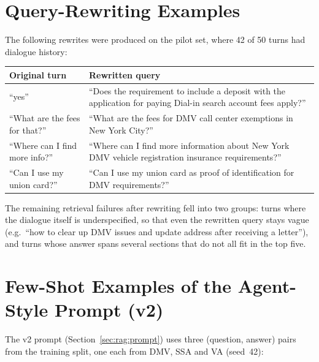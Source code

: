 \section{Query-Rewriting Examples}\label{ax:log:rewrites}

The following rewrites were produced on the pilot set, where 42 of 50 turns had
dialogue history:

\begin{center}
\small
\begin{tabular}{p{}p{}}
    \toprule
    Original turn & Rewritten query \\
    \midrule
    ``yes'' & ``Does the requirement to include a deposit with the application for
              paying Dial-in search account fees apply?'' \\
    ``What are the fees for that?'' & ``What are the fees for DMV call center
              exemptions in New York City?'' \\
    ``Where can I find more info?'' & ``Where can I find more information about
              New York DMV vehicle registration insurance requirements?'' \\
    ``Can I use my union card?'' & ``Can I use my union card as proof of
              identification for DMV requirements?'' \\
    \bottomrule
\end{tabular}
\end{center}

The remaining retrieval failures after rewriting fell into two groups: turns where
the dialogue itself is underspecified, so that even the rewritten query stays vague
(e.g.\ ``how to clear up DMV issues and update address after receiving a letter''),
and turns whose answer spans several sections that do not all fit in the top five.


\section{Few-Shot Examples of the Agent-Style Prompt (v2)}\label{ax:log:fewshot}

The v2 prompt (Section~\ref{sec:rag:prompt}) uses three (question, answer) pairs from
the training split, one each from DMV, SSA and VA (seed~42):

